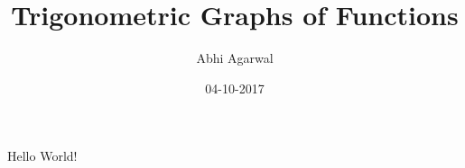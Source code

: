 \documentclass{article}
\title{Trigonometric Graphs of Functions}
\date{04-10-2017}
\author{Abhi Agarwal}
\begin{document}
  \maketitle
  \newpage

  Hello World!
\end{document}

